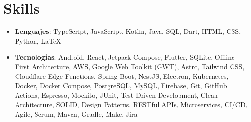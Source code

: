 \documentclass[letterpaper,11pt]{article}
\newcommand{\resumeSubHeadingListStart}{\begin{itemize}[leftmargin=*]}
\newcommand{\resumeSubHeadingListEnd}{\end{itemize}}
\begin{document}
\section{Skills}
\resumeSubHeadingListStart
\item{
            \textbf{Lenguajes}{: TypeScript, JavaScript, Kotlin, Java, SQL, Dart, HTML, CSS, Python, LaTeX}

      }
\item {
            \textbf{Tecnologías}{: Android, React, Jetpack Compose, Flutter, SQLite, Offline-First Architecture, AWS, Google Web Toolkit (GWT), Astro, Tailwind CSS, Cloudflare Edge Functions, Spring Boot, NestJS, Electron, Kubernetes, Docker, Docker Compose, PostgreSQL, MySQL, Firebase, Git, GitHub Actions, Espresso, Mockito, JUnit, Test-Driven Development, Clean Architecture, SOLID, Design Patterns, RESTful APIs, Microservices, CI/CD, Agile, Scrum, Maven, Gradle, Make, Jira}
      }
\resumeSubHeadingListEnd


\end{document}
